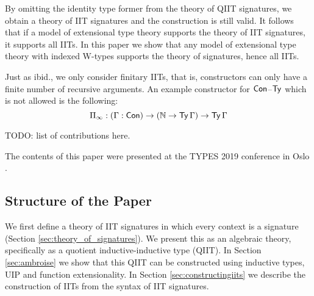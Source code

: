\documentclass[a4paper,UKenglish,cleveref, autoref]{lipics-v2019}
\begin{document}
By omitting the identity type former from the theory of QIIT
signatures, we obtain a theory of IIT signatures and the construction
is still valid. It follows that if a model of extensional type theory
supports the theory of IIT signatures, it supports all IITs. In this
paper we show that any model of extensional type theory with indexed
W-types supports the theory of signatures, hence all IITs.

Just as ibid., we only consider finitary IITs, that is, constructors
can only have a finite number of recursive arguments. An example
constructor for $\mathsf{Con}$--$\mathsf{Ty}$ which is not allowed is the following:
\[
  \Pi_\infty : (\Gamma : \mathsf{Con}) \rightarrow (\mathbb{N} \rightarrow \mathsf{Ty}\,\Gamma) \rightarrow \mathsf{Ty}\,\Gamma
\]

TODO: list of contributions here.

The contents of this paper were presented at the TYPES 2019 conference
in Oslo \cite{types}.

\subsection{Structure of the Paper}

We first define a theory of IIT signatures in which every context is a signature
(Section \ref{sec:theory_of_signatures}). We present this as an algebraic
\cite{ttintt} theory, specifically as a quotient inductive-inductive type
(QIIT). In Section \ref{sec:ambroise} we show that this QIIT can be constructed
using inductive types, UIP and function extensionality. In Section
\ref{sec:constructingiits} we describe the construction of IITs from the syntax
of IIT signatures.



\end{document}
